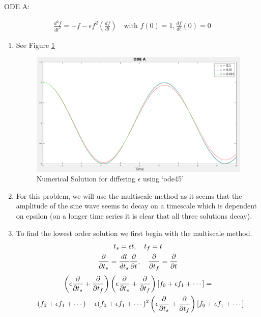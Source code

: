 \documentclass{article}
\begin{document}
\vspace{20pt}

ODE A: 

\begin{gather*}
    \frac{d^2f}{dt^2} = -f - \epsilon f^2 \left(\frac{df}{dt}\right) \quad
    \text{with } f(0) = 1, \frac{df}{dt}(0) = 0
\end{gather*}

\begin{enumerate}[label=\alph*.]
    \item See Figure \ref{fig:ODEA_num_sol}
        \begin{figure}[ht]
            \centering
            \includegraphics[width=.8\textwidth]{images/ODEA.png}
            \caption{Numerical Solution for differing $\epsilon$ using `ode45'}
            \label{fig:ODEA_num_sol}
        \end{figure}
    \item For this problem, we will use the multiscale method as it seems that
    the amplitude of the sine wave seems to decay on a timescale which is
    dependent on epsilon (on a longer time series it is clear that all three
    solutions decay). 
    \item To find the lowest order solution we first begin with the multiscale
    method. 
    \begin{gather*}
        t_s = \epsilon t, \quad t_f =  t\\
        \frac{\partial }{\partial t_s} = \frac{dt}{dt_s}\frac{\partial }{\partial t}, \quad \frac{\partial }{\partial t_f} = \frac{\partial }{\partial t}
    \end{gather*}
    \begin{gather*}
        \left(\epsilon\ppts{} + \pptf{}\right)\left(\epsilon\ppts{} + \pptf{}\right)[f_0
        +\epsilon f_1 + \cdots] =\\
        -(f_0 +\epsilon f_1 + \cdots) -
        \epsilon (f_0 + \epsilon f_1 + \cdots)^2\left(\epsilon \ppts{} +
        \pptf{}\right)[f_0 + \epsilon f_1 + \cdots]\\

\end{gather*}
\end{enumerate}
\end{document}
